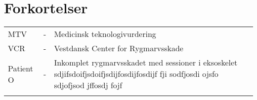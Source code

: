 \chapter{Forkortelser}

\begin{table}[H]
\center
{}
\begin{tabularx}{\linewidth}{l l X}	
MTV         & - &   Medicinsk teknologivurdering \\ \addlinespace[2mm]
VCR         & - &   Vestdansk Center for Rygmarvsskade \\ \addlinespace[2mm]
Patient O   & - &   Inkomplet rygmarvsskadet med sessioner i eksoskelet sdjifsdoifjsdoifjsdijfosdijfosdijf fji sodfjosdi ojsfo sdjofjsod jffosdj fojf \\ \addlinespace[2mm]

\end{tabularx}
\end{table}